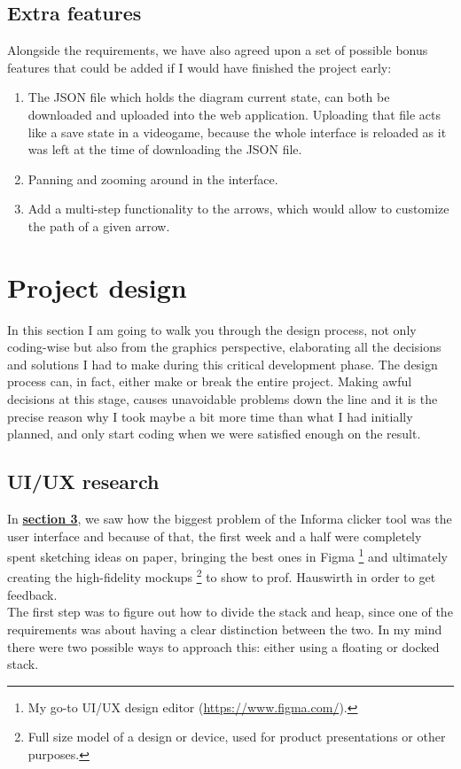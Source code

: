 \documentclass[]{usiinfbachelorproject}
\begin{document}
\subsection{Extra features}

Alongside the requirements, we have also agreed upon a set of possible bonus features that could be added if I would have finished the project early:

\begin{enumerate}
	\item The JSON file which holds the diagram current state, can both be downloaded and uploaded into the web application. Uploading that file acts like a save state in a videogame, because the whole interface is reloaded as it was left at the time of downloading the JSON file.
	\item Panning and zooming around in the interface.
	\item Add a multi-step functionality to the arrows, which would allow to customize the path of a given arrow.
\end{enumerate}

\vspace{\fill}

\pagebreak

\section{Project design} \label{design}

In this section I am going to walk you through the design process, not only coding-wise but also from the graphics perspective, elaborating all the decisions and solutions I had to make during this critical development phase. The design process can, in fact, either make or break the entire project. Making awful decisions at this stage, causes unavoidable problems down the line and it is the precise reason why I took maybe a bit more time than what I had initially planned, and only start coding when we were satisfied enough on the result.

\subsection{UI/UX research} \label{ui-ux research}

In \hyperref[requirements+analysis]{\textbf{section 3}}, we saw how the biggest problem of the Informa clicker tool was the user interface and because of that, the first week and a half were completely spent sketching ideas on paper, bringing the best ones in Figma \footnote{My go-to UI/UX design editor (\url{https://www.figma.com/}).} and ultimately creating the high-fidelity mockups \footnote{Full size model of a design or device, used for product presentations or other purposes.} to show to prof. Hauswirth in order to get feedback.\\
The first step was to figure out how to divide the stack and heap, since one of the requirements was about having a clear distinction between the two. In my mind there were two possible ways to approach this: either using a floating or docked stack.\\
\end{document}
